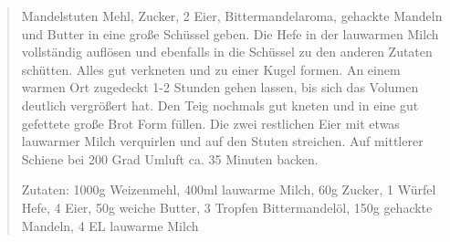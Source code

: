 {\tiny
\begin{quote}
Mandelstuten
Mehl, Zucker, 2 Eier, Bittermandelaroma, gehackte Mandeln und Butter in eine große Schüssel geben.
Die Hefe in der lauwarmen Milch vollständig auflösen und ebenfalls in die Schüssel zu den anderen Zutaten schütten. Alles gut verkneten und zu einer Kugel formen.
An einem warmen Ort zugedeckt 1-2 Stunden gehen lassen, bis sich das Volumen deutlich vergrößert hat.
Den Teig nochmals gut kneten und in eine gut gefettete große Brot Form füllen.
Die zwei restlichen Eier mit etwas lauwarmer Milch verquirlen und auf den Stuten streichen.
Auf mittlerer Schiene bei 200 Grad Umluft ca. 35 Minuten backen.

Zutaten: 1000g Weizenmehl, 400ml lauwarme Milch, 60g Zucker, 1 Würfel Hefe, 4 Eier, 50g weiche Butter, 3 Tropfen Bittermandelöl,
150g gehackte Mandeln, 4 EL lauwarme Milch
\end{quote}
}
